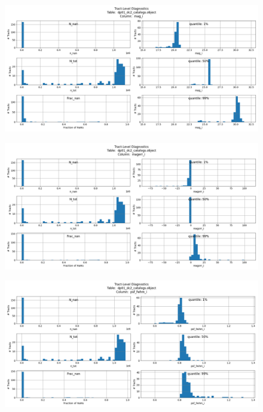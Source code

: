 \documentclass[DM,authoryear,toc]{lsstdoc}
\begin{document}
\begin{figure}[h]
\centering
\includegraphics[width=1.0\linewidth]{Plots/TAP_verify_DP01.dp01_dc2_catalogs.object.mag_i.png}
\caption{}
\label{fig:object_mag_i}
\end{figure}

\begin{figure}[h]
\centering
\includegraphics[width=1.0\linewidth]{Plots/TAP_verify_DP01.dp01_dc2_catalogs.object.magerr_i.png}
\caption{}
\label{fig:object_magerr_i}
\end{figure}

\begin{figure}[h]
\centering
\includegraphics[width=1.0\linewidth]{Plots/TAP_verify_DP01.dp01_dc2_catalogs.object.psf_fwhm_i.png}
\caption{}
\label{fig:object_psf_fwhm_i}
\end{figure}
\end{document}
